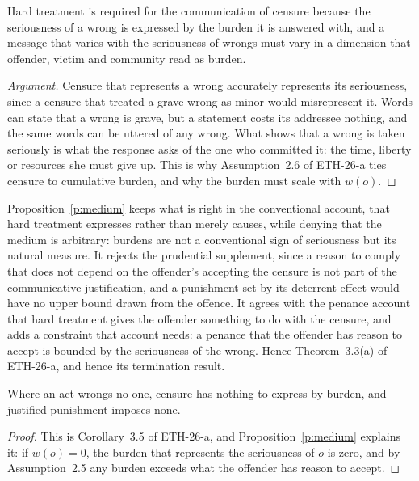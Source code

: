 \documentclass{situationist-preprint}
\begin{document}
\begin{proposition}\label{p:medium}
Hard treatment is required for the communication of censure because the seriousness of a wrong is expressed by the burden it is answered with, and a message that varies with the seriousness of wrongs must vary in a dimension that offender, victim and community read as burden.
\end{proposition}

\begin{proof}[Argument]
Censure that represents a wrong accurately represents its seriousness, since a censure that treated a grave wrong as minor would misrepresent it. Words can state that a wrong is grave, but a statement costs its addressee nothing, and the same words can be uttered of any wrong. What shows that a wrong is taken seriously is what the response asks of the one who committed it: the time, liberty or resources she must give up. This is why Assumption~2.6 of ETH-26-a ties censure to cumulative burden, and why the burden must scale with $w(o)$.
\end{proof}

Proposition~\ref{p:medium} keeps what is right in the conventional account, that hard treatment expresses rather than merely causes, while denying that the medium is arbitrary: burdens are not a conventional sign of seriousness but its natural measure. It rejects the prudential supplement, since a reason to comply that does not depend on the offender's accepting the censure is not part of the communicative justification, and a punishment set by its deterrent effect would have no upper bound drawn from the offence. It agrees with the penance account that hard treatment gives the offender something to do with the censure, and adds a constraint that account needs: a penance that the offender has reason to accept is bounded by the seriousness of the wrong. Hence Theorem~3.3(a) of ETH-26-a, and hence its termination result.

\begin{corollary}\label{c:words}
Where an act wrongs no one, censure has nothing to express by burden, and justified punishment imposes none.
\end{corollary}

\begin{proof}
This is Corollary~3.5 of ETH-26-a, and Proposition~\ref{p:medium} explains it: if $w(o)=0$, the burden that represents the seriousness of $o$ is zero, and by Assumption~2.5 any burden exceeds what the offender has reason to accept.
\end{proof}
\end{document}
